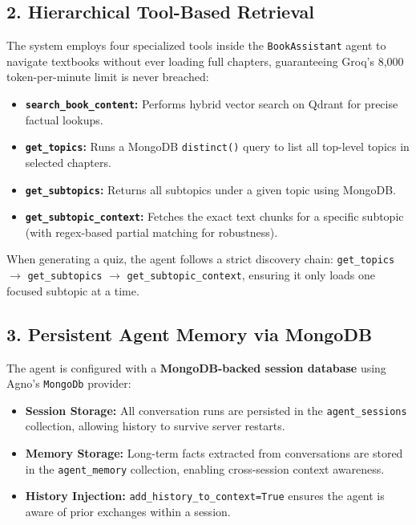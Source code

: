 \documentclass[12pt, a4paper]{article}
\begin{document}
\subsection{2. Hierarchical Tool-Based Retrieval}
The system employs four specialized tools inside the \texttt{BookAssistant} agent to navigate textbooks without ever loading full chapters, guaranteeing Groq's 8,000 token-per-minute limit is never breached:
\begin{itemize}[label=\(\bullet\)]
    \item \textbf{\texttt{search\_book\_content}:} Performs hybrid vector search on Qdrant for precise factual lookups.
    \item \textbf{\texttt{get\_topics}:} Runs a MongoDB \texttt{distinct()} query to list all top-level topics in selected chapters.
    \item \textbf{\texttt{get\_subtopics}:} Returns all subtopics under a given topic using MongoDB.
    \item \textbf{\texttt{get\_subtopic\_context}:} Fetches the exact text chunks for a specific subtopic (with regex-based partial matching for robustness).
\end{itemize}

When generating a quiz, the agent follows a strict discovery chain: \texttt{get\_topics} $\rightarrow$ \texttt{get\_subtopics} $\rightarrow$ \texttt{get\_subtopic\_context}, ensuring it only loads one focused subtopic at a time.

\subsection{3. Persistent Agent Memory via MongoDB}
The agent is configured with a \textbf{MongoDB-backed session database} using Agno's \texttt{MongoDb} provider:
\begin{itemize}[label=\(\bullet\)]
    \item \textbf{Session Storage:} All conversation runs are persisted in the \texttt{agent\_sessions} collection, allowing history to survive server restarts.
    \item \textbf{Memory Storage:} Long-term facts extracted from conversations are stored in the \texttt{agent\_memory} collection, enabling cross-session context awareness.
    \item \textbf{History Injection:} \texttt{add\_history\_to\_context=True} ensures the agent is aware of prior exchanges within a session.
\end{itemize}
\end{document}
